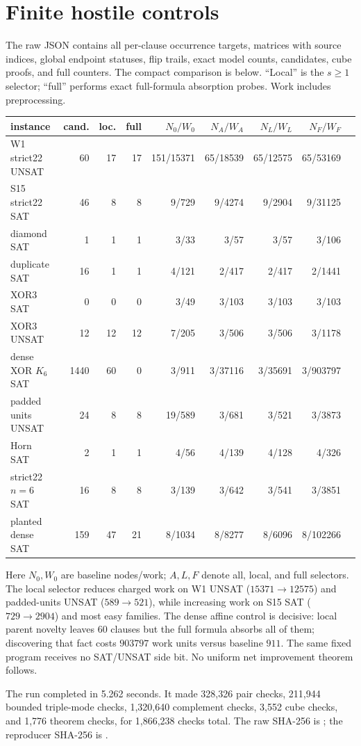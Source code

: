 \documentclass[11pt]{article}
\begin{document}
\section{Finite hostile controls}
The raw JSON contains all per-clause occurrence targets, matrices with source indices, global endpoint statuses, flip trails, exact model counts, candidates, cube proofs, and full counters.  The compact comparison is below.  ``Local'' is the $s\geq1$ selector; ``full'' performs exact full-formula absorption probes.  Work includes preprocessing.

\begin{center}
\small
\begin{tabular}{lrrrrrrrr}
\toprule
instance & cand. & loc. & full & $N_0/W_0$ & $N_A/W_A$ & $N_L/W_L$ & $N_F/W_F$\\
\midrule
W1 strict22 UNSAT &60&17&17&151/15371&65/18539&65/12575&65/53169\\
S15 strict22 SAT &46&8&8&9/729&9/4274&9/2904&9/31125\\
diamond SAT &1&1&1&3/33&3/57&3/57&3/106\\
duplicate SAT &16&1&1&4/121&2/417&2/417&2/1441\\
XOR3 SAT &0&0&0&3/49&3/103&3/103&3/103\\
XOR3 UNSAT &12&12&12&7/205&3/506&3/506&3/1178\\
dense XOR $K_6$ SAT &1440&60&0&3/911&3/37116&3/35691&3/903797\\
padded units UNSAT &24&8&8&19/589&3/681&3/521&3/3873\\
Horn SAT &2&1&1&4/56&4/139&4/128&4/326\\
strict22 $n=6$ SAT &16&8&8&3/139&3/642&3/541&3/3851\\
planted dense SAT &159&47&21&8/1034&8/8277&8/6096&8/102266\\
\bottomrule
\end{tabular}
\end{center}
Here $N_0,W_0$ are baseline nodes/work; $A,L,F$ denote all, local, and full selectors.  The local selector reduces charged work on W1 UNSAT ($15371\to12575$) and padded-units UNSAT ($589\to521$), while increasing work on S15 SAT ($729\to2904$) and most easy families.  The dense affine control is decisive: local parent novelty leaves 60 clauses but the full formula absorbs all of them; discovering that fact costs $903797$ work units versus baseline $911$.  The same fixed program receives no SAT/UNSAT side bit.  No uniform net improvement theorem follows.

The run completed in 5.262 seconds.  It made 328,326 pair checks, 211,944 bounded triple-mode checks, 1,320,640 complement checks, 3,552 cube checks, and 1,776 theorem checks, for 1,866,238 checks total.  The raw SHA-256 is
;
the reproducer SHA-256 is
.
\end{document}

